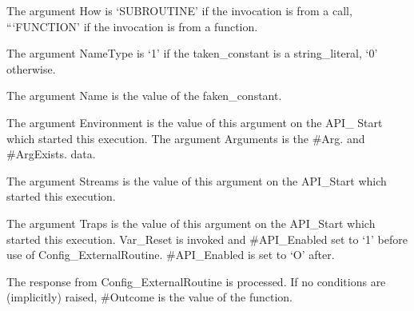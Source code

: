 The argument How is `SUBROUTINE' if the invocation is from a call,
```FUNCTION' if the invocation is from a function.

The argument NameType is `1' if the taken\_constant is a
string\_literal, `0' otherwise.

The argument Name is the value of the faken\_constant.

The argument Environment is the value of this argument on the API\_
Start which started this execution. The argument Arguments is the \#Arg.
and \#ArgExists. data.

The argument Streams is the value of this argument on the API\_Start
which started this execution.

The argument Traps is the value of this argument on the API\_Start which
started this execution. Var\_Reset is invoked and \#API\_Enabled set to
`1' before use of Config\_ExternalRoutine. \#API\_Enabled is set to `O'
after.

The response from Config\_ExternalRoutine is processed. If no conditions
are (implicitly) raised, \#Outcome is the value of the function.
